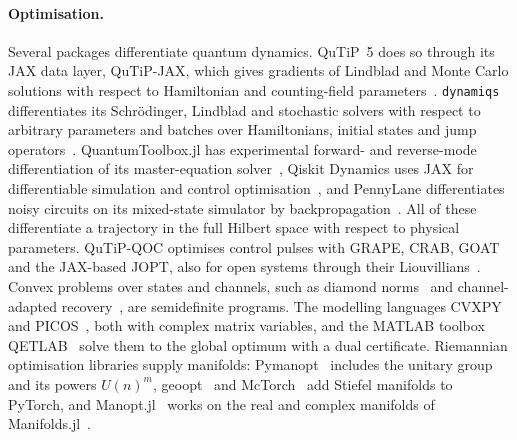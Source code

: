 \documentclass[11pt]{article}
\begin{document}
\paragraph{Optimisation.} Several packages differentiate quantum dynamics. QuTiP~5 does so through its JAX data layer,
QuTiP-JAX, which gives gradients of Lindblad and Monte Carlo solutions with respect to Hamiltonian and counting-field
parameters~\cite{lambert2026}. \texttt{dynamiqs} differentiates its Schrödinger, Lindblad and stochastic solvers with
respect to arbitrary parameters and batches over Hamiltonians, initial states and jump operators~\cite{dynamiqs}.
QuantumToolbox.jl has experimental forward- and reverse-mode differentiation of its master-equation
solver~\cite{mercurio2025}, Qiskit Dynamics uses JAX for differentiable simulation and control
optimisation~\cite{puzzuoli2023}, and PennyLane differentiates noisy circuits on its mixed-state simulator by
backpropagation~\cite{bergholm2018}. All of these differentiate a trajectory in the full Hilbert space with respect
to physical parameters. QuTiP-QOC optimises control pulses with GRAPE, CRAB, GOAT and the JAX-based JOPT, also for open
systems through their Liouvillians~\cite{lambert2026}. Convex problems over states and channels, such as diamond
norms~\cite{watrous2009} and channel-adapted recovery~\cite{fletcher2007}, are semidefinite programs. The modelling
languages CVXPY~\cite{diamond2016} and PICOS~\cite{sagnol2022}, both with complex matrix variables, and the MATLAB
toolbox QETLAB~\cite{qetlab} solve them to the global optimum with a dual certificate. Riemannian optimisation
libraries supply manifolds: Pymanopt~\cite{townsend2016} includes the unitary group and its powers $U(n)^m$,
geoopt~\cite{kochurov2020} and McTorch~\cite{meghwanshi2018} add Stiefel manifolds to PyTorch, and
Manopt.jl~\cite{bergmann2022} works on the real and complex manifolds of Manifolds.jl~\cite{axen2023}.
\end{document}
